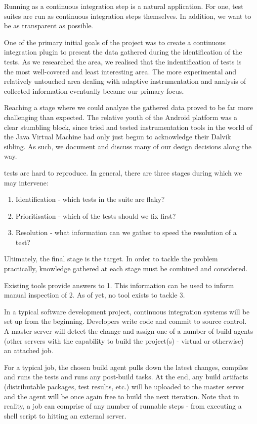 Running as a continuous integration step is a natural application. For one, test
suites are run as continuous integration steps themselves. In addition, we want
to be as transparent as possible.

One of the primary initial goals of the project was to create a continuous
integration plugin to present the data gathered during the identification of the
\flaky tests. As we researched the area, we realised that the indentification of
\flaky tests is the most well-covered and least interesting area. The more
experimental and relatively untouched area dealing with adaptive instrumentation
and analysis of collected information eventually became our primary focus.

Reaching a stage where we could analyze the gathered data proved to be far more
challenging than expected. The relative youth of the Android platform was a
clear stumbling block, since tried and tested instrumentation tools in the world
of the Java Virtual Machine had only just begun to acknowledge their Dalvik
sibling. As such, we document and discuss many of our design decisions along the
way.

\Flaky tests are hard to reproduce. In general, there are three stages during
which we may intervene:
\begin{enumerate}
	\item Identification - which tests in the suite are flaky?
	\item Prioritisation - which of the \flaky tests should we fix first?
	\item Resolution - what information can we gather to speed the resolution of a test?
\end{enumerate}

Ultimately, the final stage is the target. In order to tackle the problem
practically, knowledge gathered at each stage must be combined and considered.

Existing tools provide answers to 1. This information can be used to inform
manual inspection of 2. As of yet, no tool exists to tackle 3.

In a typical software development project, continuous integration systems will
be set up from the beginning. Developers write code and commit to source
control. A master server will detect the change and assign one of a number of
build agents (other servers with the capability to build the project(s) -
virtual or otherwise) an attached job.

For a typical job, the chosen build agent pulls down the latest changes,
compiles and runs the tests and runs any post-build tasks. At the end, any build
artifacts (distributable packages, test results, etc.) will be uploaded to the
master server and the agent will be once again free to build the next iteration.
Note that in reality, a job can comprise of any number of runnable steps - from
executing a shell script to hitting an external server.

